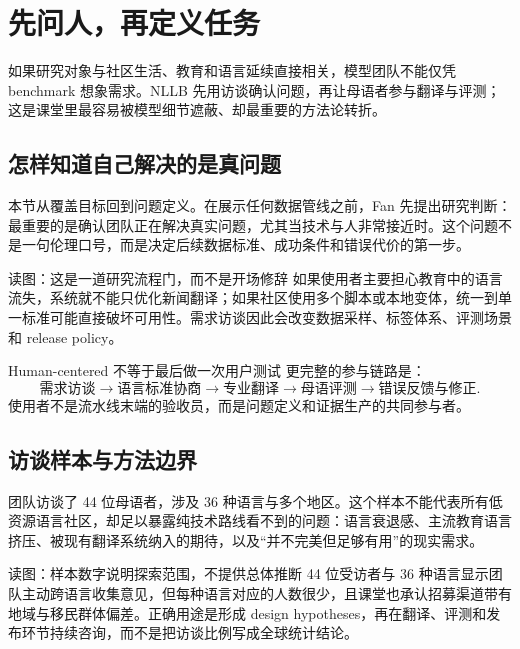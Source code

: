 \section{先问人，再定义任务}

如果研究对象与社区生活、教育和语言延续直接相关，模型团队不能仅凭 benchmark 想象需求。NLLB 先用访谈确认问题，再让母语者参与翻译与评测；这是课堂里最容易被模型细节遮蔽、却最重要的方法论转折。

\subsection{怎样知道自己解决的是真问题}

本节从覆盖目标回到问题定义。在展示任何数据管线之前，Fan 先提出研究判断：最重要的是确认团队正在解决真实问题，尤其当技术与人非常接近时。这个问题不是一句伦理口号，而是决定后续数据标准、成功条件和错误代价的第一步。


\begin{knowledgebox}{读图：这是一道研究流程门，而不是开场修辞}
如果使用者主要担心教育中的语言流失，系统就不能只优化新闻翻译；如果社区使用多个脚本或本地变体，统一到单一标准可能直接破坏可用性。需求访谈因此会改变数据采样、标签体系、评测场景和 release policy。
\end{knowledgebox}

\begin{importantbox}{Human-centered 不等于最后做一次用户测试}
更完整的参与链路是：
\[
\text{需求访谈}\rightarrow\text{语言标准协商}\rightarrow\text{专业翻译}
\rightarrow\text{母语评测}\rightarrow\text{错误反馈与修正}.
\]
使用者不是流水线末端的验收员，而是问题定义和证据生产的共同参与者。
\end{importantbox}

\subsection{访谈样本与方法边界}

团队访谈了 44 位母语者，涉及 36 种语言与多个地区。这个样本不能代表所有低资源语言社区，却足以暴露纯技术路线看不到的问题：语言衰退感、主流教育语言挤压、被现有翻译系统纳入的期待，以及“并不完美但足够有用”的现实需求。


\begin{knowledgebox}{读图：样本数字说明探索范围，不提供总体推断}
44 位受访者与 36 种语言显示团队主动跨语言收集意见，但每种语言对应的人数很少，且课堂也承认招募渠道带有地域与移民群体偏差。正确用途是形成 design hypotheses，再在翻译、评测和发布环节持续咨询，而不是把访谈比例写成全球统计结论。
\end{knowledgebox}

